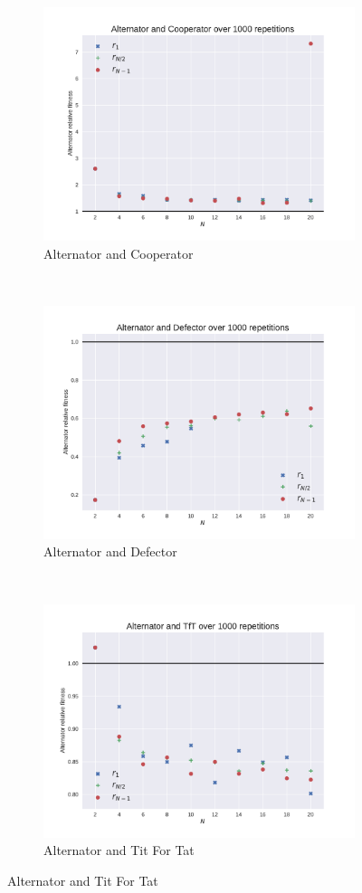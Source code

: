 \documentclass{article}
\begin{document}
\begin{figure}[!hbtp]
    \centering
    \begin{subfigure}[t]{.3\textwidth}
        \centering
        \includegraphics[width=.8\textwidth]{./img/Alternator_v_Cooperator_fitness.pdf}
        \caption{Alternator and Cooperator}
    \end{subfigure}%
    ~
    \begin{subfigure}[t]{.3\textwidth}
        \centering
        \includegraphics[width=.8\textwidth]{./img/Alternator_v_Defector_fitness.pdf}
        \caption{Alternator and Defector}
    \end{subfigure}%
    ~
    \begin{subfigure}[t]{.3\textwidth}
        \centering
        \includegraphics[width=.8\textwidth]{./img/Alternator_v_TfT_fitness.pdf}
        \caption{Alternator and Tit For Tat}
    \end{subfigure}%


\end{figure}
\end{document}
